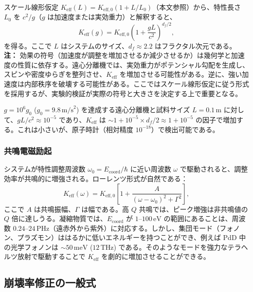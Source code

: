 \documentclass[12pt]{article}
\newcommand{\Keff}{K_{\mathrm{eff}}}
\newcommand{\Keffzero}{K_{\mathrm{eff},0}}
\newcommand{\df}{d_{\!f}}
\theoremstyle{remark}
\begin{document}
	スケール線形仮定 \(\Keff(L) = \Keffzero (1 + L/L_0)\)（本文参照）から、特性長さ \(L_0\) を \(c^2/g\)（\(g\) は加速度または実効重力）と解釈すると、
	\begin{equation}
		\Keff(g) = \Keffzero \left(1 + \frac{gL}{c^2}\right)^{\df/2},
		\label{eq:keff-g}
	\end{equation}
	を得る。ここで \(L\) はシステムのサイズ、\(\df \approx 2.2\) はフラクタル次元である。\textbf{注：} 効果の符号（加速度が調整を増加させるか減少させるか）は幾何学と加速度の性質に依存する。遠心分離機では、実効重力がポテンシャル勾配を生成し、スピンや密度ゆらぎを整列させ、\(\Keff\) を増加させる可能性がある。逆に、強い加速度は内部秩序を破壊する可能性がある。ここではスケール線形仮定に従う形式を採用するが、実験的検証が実際の符号と大きさを決定する上で重要となる。
	
	\(g = 10^6g_0\) (\(g_0 = 9.8\,\text{m/s}^2\)) を達成する遠心分離機と試料サイズ \(L = 0.1\,\text{m}\) に対して、\(gL/c^2 \approx 10^{-5}\) であり、\(\Keff\) は \(\sim 1 + 10^{-5}\times\df/2 \approx 1 + 10^{-5}\) の因子で増加する。これは小さいが、原子時計（相対精度 \(10^{-18}\)）で検出可能である。
	
	\subsubsection{共鳴電磁励起}
	
	システムが特性調整周波数 \(\omega_0 = E_{\mathrm{coord}}/\hbar\) に近い周波数 \(\omega\) で駆動されると、調整効率が共鳴的に増強される。ローレンツ形式が自然である：
	\begin{equation}
		\Keff(\omega) = \Keffzero \left[ 1 + \frac{A}{(\omega - \omega_0)^2 + \Gamma^2} \right],
		\label{eq:keff-omega}
	\end{equation}
	ここで \(A\) は共鳴振幅、\(\Gamma\) は幅である。高 \(Q\) 共鳴では、ピーク増強は非共鳴値の \(Q\) 倍に達しうる。凝縮物質では、\(E_{\mathrm{coord}}\) が \(1\)–\(100\,\text{eV}\) の範囲にあることは、周波数 \(0.24\)–\(24\,\text{PHz}\)（遠赤外から紫外）に対応する。しかし、集団モード（フォノン、プラズモン）ははるかに低いエネルギーを持つことができ、例えば PdD 中の光学フォノンは \(\sim 50\,\text{meV}\) (\(12\,\text{THz}\)) である。そのようなモードを強力なテラヘルツ放射で駆動することで \(\Keff\) を劇的に増加させることができる。
	
	\subsection{崩壊率修正の一般式}
	
\end{document}
